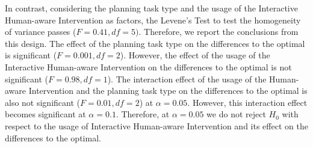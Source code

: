 In contrast, considering the planning task type and the usage of the Interactive Human-aware Intervention as factors, the Levene's Test to test the homogeneity of variance passes ($F=0.41, df=5)$.
Therefore, we report the conclusions from this design.
The effect of the planning task type on the differences to the optimal is significant ($F=0.001, df=2$).
However, the effect of the usage of the Interactive Human-aware Intervention on the differences to the optimal is not significant ($F=0.98, df=1$).
The interaction effect of the usage of the Human-aware Intervention and the planning task type on the differences to the optimal is also not significant ($F=0.01, df=2$) at $\alpha=0.05$.
However, this interaction effect becomes significant at $\alpha=0.1$.
Therefore, at $\alpha=0.05$ we do not reject $H_0$ with respect to the usage of Interactive Human-aware Intervention and its effect on the differences to the optimal.



